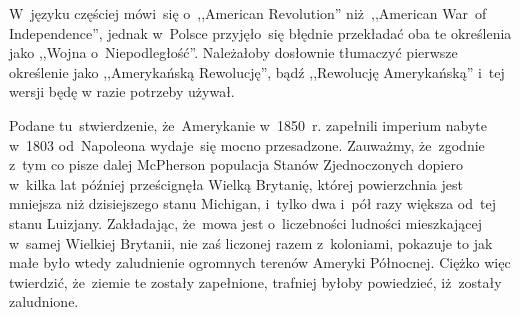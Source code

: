 \documentclass[a4paper,11pt]{article}
\begin{document}
\vspace{\spaceFour}


\start W~języku częściej mówi~się o~,,American Revolution''
niż~,,American War~of Independence'', jednak w~Polsce przyjęło~się
błędnie przekładać oba te określenia jako ,,Wojna o~Niepodległość''.
Należałoby dosłownie tłumaczyć pierwsze określenie jako ,,Amerykańską
Rewolucję'', bądź ,,Rewolucję Amerykańską'' i~tej wersji będę w razie
potrzeby używał.

\vspace{\spaceFour}


\start {} Podane tu~stwierdzenie, że~Amerykanie w~1850~r.
zapełnili imperium nabyte w~1803 od~Napoleona wydaje~się mocno
przesadzone. Zauważmy, że~zgodnie z~tym co pisze dalej McPherson
populacja Stanów Zjednoczonych dopiero w~kilka lat później
prześcignęła Wielką Brytanię, której powierzchnia jest mniejsza niż
dzisiejszego stanu Michigan, i~tylko dwa i~pół razy większa od~tej
stanu Luizjany. Zakładając, że~mowa jest o~liczebności ludności
mieszkającej w~samej Wielkiej Brytanii, nie zaś liczonej razem
z~koloniami, pokazuje to jak małe było wtedy zaludnienie ogromnych
terenów Ameryki Północnej. Ciężko więc twierdzić, że~ziemie te zostały
zapełnione, trafniej byłoby powiedzieć, iż~zostały zaludnione.

\end{document}
